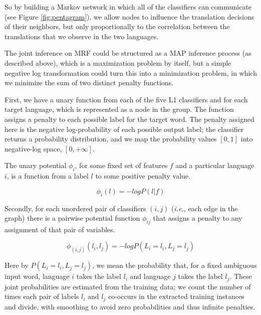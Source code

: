 \documentclass[11pt,letterpaper]{article}
\begin{document}
So by building a Markov network in which all of the classifiers can
communicate (see Figure \ref{fig:pentagram}), we allow nodes to influence the
translation decisions of their neighbors, but only proportionally to the
correlation between the translations that we observe in the two languages.


The joint inference on MRF could be structured as a MAP inference process (as described above),
which is a maximization problem by itself, but a simple negative log transformation could turn this into
a minimization problem, in which we minimize the sum of two distinct penalty functions.



First, we have a unary function from each of the five L1 classifiers and for
each target language, which is represented as a node in the group.  The
function assigns a penalty to each possible label for the target word.  The
penalty assigned here is the negative log-probability of each possible output
label; the classifier returns a probability distribution, and we map the
probability values $[0,1]$ into negative-log space, $[0, +\infty]$.

The unary potential $\phi_i$, for some fixed set of features $f$ and a
particular language $i$, is a function from a label $l$ to some positive
penalty value.

$$
\phi_i(l) = - log P(l | f)
$$

Secondly, for each unordered pair of classifiers $(i,j)$ (\emph{i.e.}, each
edge in the graph) there is a pairwise potential function $\phi_{ij}$ that
assigns a penalty to any assignment of that pair of variables.

$$
\phi_{(i,j)}(l_i, l_j) = - log P(L_i = l_i, L_j = l_j)
$$

Here by $P(L_i = l_i, L_j = l_j)$, we mean the probability that, for a fixed
ambiguous input word, language $i$ takes the label $l_i$ and language $j$ takes
the label $l_j$. These joint probabilities are estimated from the training
data; we count the number of times each pair of labels $l_i$ and $l_j$
co-occurs in the extracted training instances and divide, with smoothing to
avoid zero probabilities and thus infinite penalties.
\end{document}
